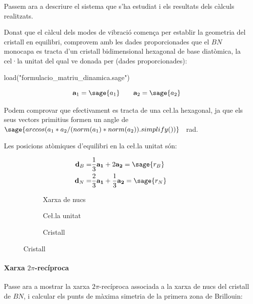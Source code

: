 \documentclass[12pt]{article} %
\let\vec\mathbf %
\begin{document}
Passem ara a descriure el sistema que s'ha estudiat i els resultats dels càlculs realitzats.

Donat que el càlcul dels modes de vibració comença per establir la geometria del cristall en equilibri, comprovem amb les dades proporcionades que el $BN$ monocapa es tracta d'un cristall bidimensional hexagonal de base diatòmica, la cel·la unitat del qual ve donada per (dades proporcionades):

\begin{sagesilent}
load("formulacio_matriu_dinamica.sage")
\end{sagesilent}

\begin{equation}
\vec a_1=\sage{a_1}\qquad\vec a_2=\sage{a_2} 
\end{equation}

Podem comprovar que efectivament es tracta de una ce\l.la hexagonal, ja que els seus vectors primitius formen un angle de $\sage{arccos(a_1*a_2/(norm(a_1)*norm(a_2)).simplify())}$ \SI{}{\radian}.

Les posicions atòmiques d'equilibri en la ce\l.la unitat són:

\begin{equation}\begin{split}
\vec d_B=&\frac{1}{3}\vec{a_1}+2\vec{a_2}=\sage{r_B}\qquad\\
\vec d_N=&\frac{2}{3}\vec{a_1}+\frac{1}{3}\vec{a_2}=\sage{r_N} 
\end{split}\end{equation} 



\begin{figure}[h]
\centering
\begin{subfigure}[b]{0.3\textwidth}
\centering
{}
\caption{Xarxa de nucs}
\end{subfigure}
\begin{subfigure}[b]{0.3\textwidth}
\centering
{}
\caption{Ce\l.la unitat}
\end{subfigure}
\begin{subfigure}[b]{0.3\textwidth}
\centering
{}
\caption{Cristall}
\end{subfigure}
\end{figure}


\paragraph{Xarxa $2\pi$-recíproca}
Passe ara a mostrar la xarxa $2\pi$-recíproca associada a la xarxa de nucs del cristall de $BN$, i calcular els punts de màxima simetria de la primera zona de Brillouin:
\end{document}
